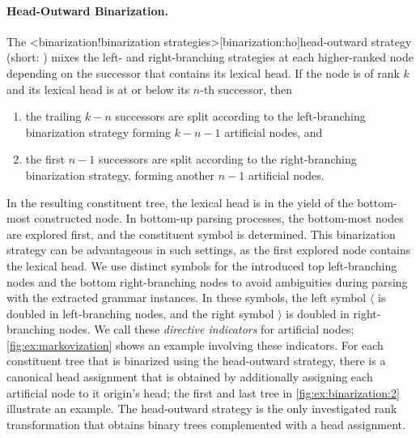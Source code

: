 \documentclass[../../document.tex]{subfiles}
\begin{document}
    \paragraph{Head-Outward Binarization.}
    The <binarization!binarization strategies>[binarization:ho]{head-outward strategy} (short: ) mixes the left- and right-branching strategies at each higher-ranked node depending on the successor that contains its lexical head.
    If the node is of rank \(k\) and its lexical head is at or below its \(n\)-th successor, then
    \begin{enumerate}
        \item the trailing \(k-n\) successors are split according to the left-branching binarization strategy forming \(k-n-1\) artificial nodes, and
        \item the first \(n-1\) successors are split according to the right-branching binarization strategy, forming another \(n-1\) artificial nodes.
    \end{enumerate}
    In the resulting constituent tree, the lexical head is in the yield of the bottom-most constructed node.
    In bottom-up parsing processes, the bottom-most nodes are explored first, and the constituent symbol is determined.
    This binarization strategy can be advantageous in such settings, as the first explored node contains the lexical head.
    We use distinct symbols for the introduced top left-branching nodes and the bottom right-branching nodes to avoid ambiguities during parsing with the extracted grammar instances.
    In these symbols, the left symbol \(\langle\) is doubled in left-branching nodes, and the right symbol \(\rangle\) is doubled in right-branching nodes.
    We call these \emph{directive indicators} for artificial nodes; \cref{fig:ex:markovization} shows an example involving these indicators.
    For each constituent tree that is binarized using the head-outward strategy, there is a canonical head assignment that is obtained by additionally assigning each artificial node to it origin's head; the first and last tree in \cref{fig:ex:binarization:2} illustrate an example.
    The head-outward strategy is the only investigated rank transformation that obtains binary trees complemented with a head assignment.
\end{document}
